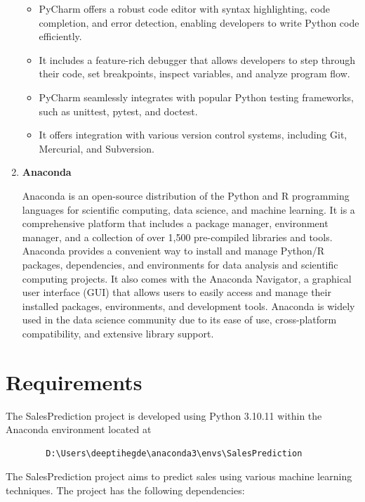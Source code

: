\begin{enumerate}
			\begin{itemize}
				
				\item PyCharm offers a robust code editor with syntax highlighting, code completion, and error detection, enabling developers to write Python code efficiently. 
				
				\item It includes a feature-rich debugger that allows developers to step through their code, set breakpoints, inspect variables, and analyze program flow.
				
				\item PyCharm seamlessly integrates with popular Python testing frameworks, such as unittest, pytest, and doctest.
				
				\item It offers integration with various version control systems, including Git, Mercurial, and Subversion.
				
			\end{itemize}
		
		\item \textbf{Anaconda}
		
			Anaconda is an open-source distribution of the Python and R programming languages for scientific computing, data science, and machine learning. It is a comprehensive platform that includes a package manager, environment manager, and a collection of over 1,500 pre-compiled libraries and tools. Anaconda provides a convenient way to install and manage Python/R packages, dependencies, and environments for data analysis and scientific computing projects. It also comes with the Anaconda Navigator, a graphical user interface (GUI) that allows users to easily access and manage their installed packages, environments, and development tools. Anaconda is widely used in the data science community due to its ease of use, cross-platform compatibility, and extensive library support.
			
	\end{enumerate}

\section{Requirements}

	The SalesPrediction project is developed using Python 3.10.11 within the Anaconda environment located at 
	\begin{verbatim}
		D:\Users\deeptihegde\anaconda3\envs\SalesPrediction
	\end{verbatim}
	The SalesPrediction project aims to predict sales using various machine learning techniques. The project has the following dependencies:
	
